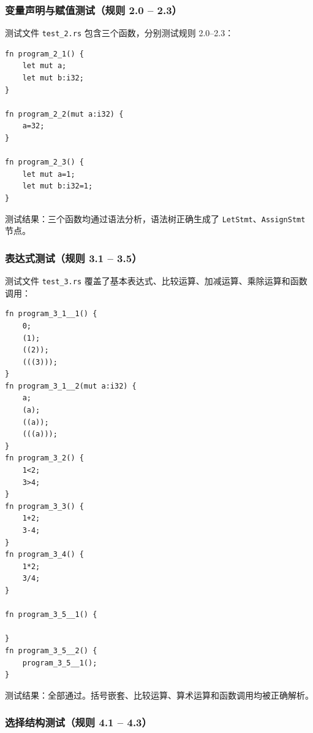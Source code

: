 \documentclass[12pt,a4paper]{ctexart}
\begin{document}
\subsubsection{变量声明与赋值测试（规则 2.0 -- 2.3）}

测试文件 \texttt{test\_2.rs} 包含三个函数，分别测试规则 2.0--2.3：

\begin{lstlisting}[language=RustLike, caption={test\_2.rs -- 变量声明与赋值（规则 2.0--2.3）}]
fn program_2_1() {
    let mut a;
    let mut b:i32;
}

fn program_2_2(mut a:i32) {
    a=32;
}

fn program_2_3() {
    let mut a=1;
    let mut b:i32=1;
}
\end{lstlisting}

测试结果：三个函数均通过语法分析，语法树正确生成了 \texttt{LetStmt}、\texttt{AssignStmt} 节点。

\subsubsection{表达式测试（规则 3.1 -- 3.5）}

测试文件 \texttt{test\_3.rs} 覆盖了基本表达式、比较运算、加减运算、乘除运算和函数调用：

\begin{lstlisting}[language=RustLike, caption={test\_3.rs -- 表达式（规则 3.1--3.5）}]
fn program_3_1__1() {
    0;
    (1);
    ((2));
    (((3)));
}
fn program_3_1__2(mut a:i32) {
    a;
    (a);
    ((a));
    (((a)));
}
fn program_3_2() {
    1<2;
    3>4;
}
fn program_3_3() {
    1+2;
    3-4;
}
fn program_3_4() {
    1*2;
    3/4;
}

fn program_3_5__1() {

}
fn program_3_5__2() {
    program_3_5__1();
}
\end{lstlisting}

测试结果：全部通过。括号嵌套、比较运算、算术运算和函数调用均被正确解析。

\subsubsection{选择结构测试（规则 4.1 -- 4.3）}
\end{document}
